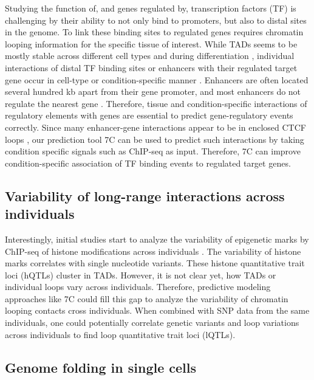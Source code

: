 \documentclass[a4paper,twoside=true,openright,parskip=full,chapterprefix=true,11pt,headings=normal,bibliography=totoc,listof=totoc,titlepage=on,captions=tableabove,draft=false]{scrreprt}
\theoremstyle{definition}
\theoremstyle{definition}
\theoremstyle{definition}
\theoremstyle{remark}
\begin{document}
Studying the function of, and genes regulated by, transcription factors
(TF) is challenging by their ability to not only bind to promoters, but
also to distal sites in the genome. To link these binding sites to
regulated genes requires chromatin looping information for the specific
tissue of interest. While TADs seems to be mostly stable across
different cell types \citep{Dixon2012} and during differentiation
\citep{Dixon2015}, individual interactions of distal TF binding sites or
enhancers with their regulated target gene occur in cell-type or
condition-specific manner \citep{Bonev2016, Andrey2017}. Enhancers are
often located several hundred kb apart from their gene promoter, and
most enhancers do not regulate the nearest gene \citep{Sanyal2012}.
Therefore, tissue and condition-specific interactions of regulatory
elements with genes are essential to predict gene-regulatory events
correctly. Since many enhancer-gene interactions appear to be in
enclosed CTCF loops \citep{Hnisz2016a}, our prediction tool 7C can be
used to predict such interactions by taking condition specific signals
such as ChIP-seq as input. Therefore, 7C can improve condition-specific
association of TF binding events to regulated target genes.

\hypertarget{variability-of-long-range-interactions-across-individuals}{%
\subsection{Variability of long-range interactions across
individuals}\label{variability-of-long-range-interactions-across-individuals}}

Interestingly, initial studies start to analyze the variability of
epigenetic marks by ChIP-seq of histone modifications across individuals
\citep{Grubert2015, Waszak2015}. The variability of histone marks
correlates with single nucleotide variants. These histone quantitative
trait loci (hQTLs) cluster in TADs. However, it is not clear yet, how
TADs or individual loops vary across individuals. Therefore, predictive
modeling approaches like 7C could fill this gap to analyze the
variability of chromatin looping contacts cross individuals. When
combined with SNP data from the same individuals, one could potentially
correlate genetic variants and loop variations across individuals to
find loop quantitative trait loci (lQTLs).

\hypertarget{single-cell}{%
\subsection{Genome folding in single cells}\label{single-cell}}
\end{document}
